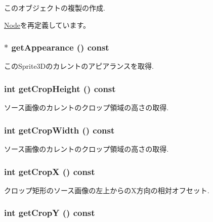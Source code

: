 このオブジェクトの複製の作成. 

\hyperlink{classm3g_1_1Node_0b9f7531a4b56d34f47aeb1fff0d37e0}{Node}を再定義しています。\hypertarget{classm3g_1_1Sprite3D_0219cb20ddea978a5796b5b414d012d2}{
\subsubsection[{getAppearance}]{ $\ast$ getAppearance () const}}
\label{classm3g_1_1Sprite3D_0219cb20ddea978a5796b5b414d012d2}


このSprite3Dのカレントのアピアランスを取得. \hypertarget{classm3g_1_1Sprite3D_d6d9d6f23b7bb004c93642bcd081f4a3}{
\subsubsection[{getCropHeight}]{\setlength{\rightskip}{0pt plus 5cm}int getCropHeight () const}}
\label{classm3g_1_1Sprite3D_d6d9d6f23b7bb004c93642bcd081f4a3}


ソース画像のカレントのクロップ領域の高さの取得. \hypertarget{classm3g_1_1Sprite3D_5c6515f6706675ef31ca5dfa0a03b953}{
\subsubsection[{getCropWidth}]{\setlength{\rightskip}{0pt plus 5cm}int getCropWidth () const}}
\label{classm3g_1_1Sprite3D_5c6515f6706675ef31ca5dfa0a03b953}


ソース画像のカレントのクロップ領域の高さの取得. \hypertarget{classm3g_1_1Sprite3D_d0ba0211183decc8f0459ca598b12912}{
\subsubsection[{getCropX}]{\setlength{\rightskip}{0pt plus 5cm}int getCropX () const}}
\label{classm3g_1_1Sprite3D_d0ba0211183decc8f0459ca598b12912}


クロップ矩形のソース画像の左上からのX方向の相対オフセット. \hypertarget{classm3g_1_1Sprite3D_9ef03b219415a1f08aef6745ad5d87d0}{
\subsubsection[{getCropY}]{\setlength{\rightskip}{0pt plus 5cm}int getCropY () const}}
\label{classm3g_1_1Sprite3D_9ef03b219415a1f08aef6745ad5d87d0}



